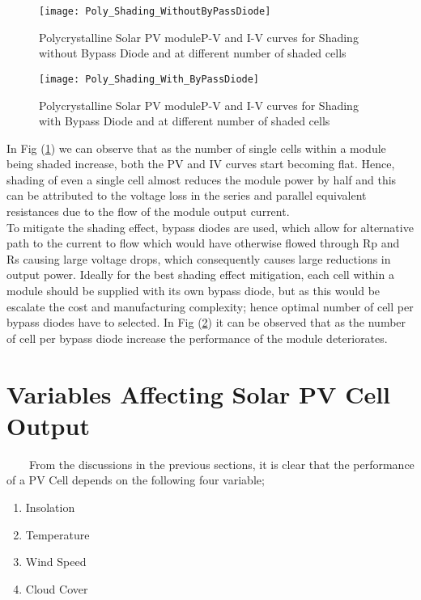 \begin{figure}[H]
\centering
\texttt{[image: Poly\_Shading\_WithoutByPassDiode]}
\caption{Polycrystalline Solar PV moduleP-V and I-V curves for Shading without Bypass Diode and at different number of shaded cells}
\label{figc3h23} %
\end{figure}

\begin{figure}[H]
\centering
\texttt{[image: Poly\_Shading\_With\_ByPassDiode]}
\caption{Polycrystalline Solar PV moduleP-V and I-V curves for Shading with Bypass Diode and at different number of shaded cells}
\label{figc3h24} %
\end{figure}

In Fig (\ref{figc3h23}) we can observe that as the number of single cells within a module being shaded increase, both the PV and IV curves start becoming flat. Hence, shading of even a single cell almost reduces the module power by half and this can be attributed to the voltage loss in the series and parallel equivalent resistances due to the flow of the module output current.\\

To mitigate the shading effect, bypass diodes are used, which allow for alternative path to the current to flow which would have otherwise flowed through Rp and Rs causing large voltage drops, which consequently causes large reductions in output power. Ideally for the best shading effect mitigation, each cell within a module should be supplied with its own bypass diode, but as this would be escalate the cost and manufacturing complexity; hence optimal number of cell per bypass diodes have to selected. In Fig (\ref{figc3h24}) it can be observed that as the number of cell per bypass diode increase the performance of the module deteriorates.\\

\newpage

\section{Variables Affecting Solar PV Cell Output}
\
\
\
\
From the discussions in the previous sections, it is clear that the performance of a PV Cell depends on the following four variable;

\begin{enumerate}
\item Insolation
\item Temperature
\item Wind Speed
\item Cloud Cover
\end{enumerate}

